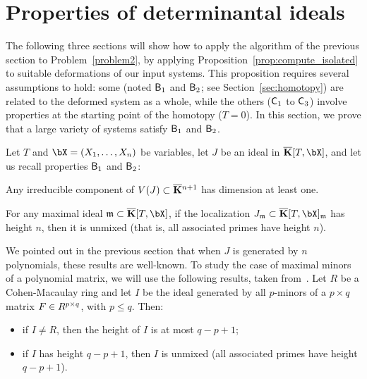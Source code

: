 \documentclass[12pt]{article}
\begin{document}

\section{Properties of determinantal ideals}\label{sec:check}

The following three sections will show how to apply the algorithm of the
previous section to Problem~\ref{problem2}, by applying
Proposition~\ref{prop:compute_isolated} to suitable deformations of
our input systems. This proposition requires several assumptions to
hold: some (noted $\mathsf{B}_1$ and $\mathsf{B}_2$; see
Section~\ref{sec:homotopy}) are related to the deformed system as a
whole, while the others ($\mathsf{C}_1$ to $\mathsf{C}_3$) involve properties at
the starting point of the homotopy ($T=0$). In this section, we prove
that a large variety of systems satisfy $\mathsf{B}_1$ and $\mathsf{B}_2$.

Let $T$ and $\bX=(X_1,\dots,X_n)$ be variables, let $J$ be an ideal in
$\KKbar[T,\bX]$, and let us recall properties $\mathsf{B}_1$ and $\mathsf{B}_2$: 
\begin{description}[leftmargin=*]
\item[$\assA_1.$] Any irreducible component of $V(J) \subset
  \overline{\mathbf{K}}{}^{n+1}$ has dimension at least one.
\item[$\assA_2.$] For any maximal ideal $\m \subset\KKbar[T,\bX]$,
  if the localization $J_\m \subset \KKbar[T,\bX]_\m$ has height $n$,
  then it is unmixed (that is, all associated primes have height $n$).
\end{description}

We pointed out in the previous section that when $J$ is generated by
$n$ polynomials, these results are well-known. To study the case of
maximal minors of a polynomial matrix, we will use the following
results, taken from~\cite[Section~6]{EN62}. Let $R$ be a
Cohen-Macaulay ring and let $I$ be the ideal generated by all $p$-minors
of a $p\times q$ matrix ${F} \in R^{p\times q}$, with $p \le q$. Then:
\begin{itemize}
\item if $I \ne R$, then the height of $I$ is at most $q-p+1$;
\item if $I$ has height $q-p+1$, then $I$ is unmixed (all associated
  primes have height $q-p+1$).
\end{itemize}
\end{document}

